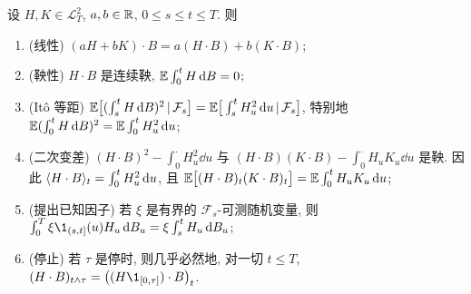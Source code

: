 \begin{theorem}[It\^o 积分的性质]\label{thm:ito-properties}
设 $H,K\in\mathscr{L}^2_T$, $a,b\in\mathbb{R}$, $0\le s\le t\le T$. 则
\begin{enumerate}
\item (线性) $(aH+bK)\cdot B=a(H\cdot B)+b(K\cdot B)$;
\item (鞅性) $H\cdot B$ 是连续鞅, $\mathbb{E}\int_0^tH\mathop{}\!\mathrm{d} B=0$;
\item (It\^o 等距) $\mathbb{E}\big[(\int_s^tH\mathop{}\!\mathrm{d} B)^2\,|\,\mathcal{F}_s\big]=\mathbb{E}\big[\int_s^tH_u^2\mathop{}\!\mathrm{d} u\,|\,\mathcal{F}_s\big]$, 特别地 $\mathbb{E}(\int_0^tH\mathop{}\!\mathrm{d} B)^2=\mathbb{E}\int_0^tH_u^2\mathop{}\!\mathrm{d} u$;
\item (二次变差) $(H\cdot B)^2-\int_0^\cdot H_u^2\dd u$ 与 $(H\cdot B)(K\cdot B)-\int_0^\cdot H_uK_u\dd u$ 是鞅. 因此 $\langle H\cdot B\rangle_t=\int_0^tH_u^2\mathop{}\!\mathrm{d} u$, 且 $\mathbb{E}\big[(H\cdot B)_t(K\cdot B)_t\big]=\mathbb{E}\int_0^tH_uK_u\mathop{}\!\mathrm{d} u$;
\item (提出已知因子) 若 $\xi$ 是有界的 $\mathcal{F}_s$-可测随机变量, 则 $\int_0^T\xi\1_{(s,t]}(u)H_u\dd B_u=\xi\int_s^tH_u\dd B_u$;
\item (停止) 若 $\tau$ 是停时, 则几乎必然地, 对一切 $t\le T$, $(H\cdot B)_{t\wedge\tau}=\big((H\1_{[0,\tau]})\cdot B\big)_t$.
\end{enumerate}
\end{theorem}

